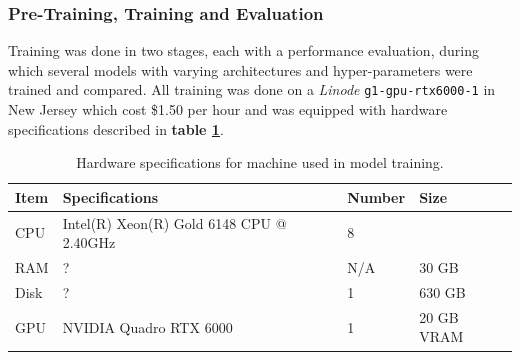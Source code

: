 \documentclass[16pt]{book}
\begin{document}
\subsubsection{Pre-Training, Training and Evaluation}

Training was done in two stages, each with a performance evaluation, during which several models with varying architectures and hyper-parameters were trained and compared.
All training was done on a \textit{Linode} \texttt{g1-gpu-rtx6000-1} in New Jersey which cost \$1.50 per hour and was equipped with hardware specifications described in \textbf{table \ref{hardwaretable}}.

\begin{table}
	\begin{center}
		\caption{\label{hardwaretable} Hardware specifications for machine used in model training.}
		\begin{tabular}{l|p{3cm}|l|l}
			\textbf{Item} & \textbf{Specifications} & \textbf{Number}  & \textbf{Size}\\
		\hline 
		CPU  & Intel(R) Xeon(R) Gold 6148 CPU @ 2.40GHz & 8 \\
		RAM  & ?  & N/A & 30 GB \\
		Disk & ?  & 1   & 630 GB \\
		GPU  & NVIDIA Quadro RTX 6000 & 1 & 20 GB VRAM \\ 

	\end{tabular}
	\end{center}
\end{table}
\end{document}
